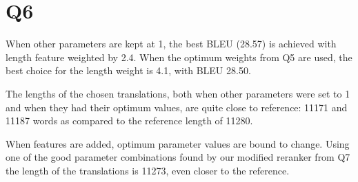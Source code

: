 \section*{Q6}
When other parameters are kept at 1, the best BLEU (28.57) is achieved with length feature weighted by 2.4. When the optimum weights from Q5 are used, the best choice for the length weight is 4.1, with BLEU 28.50.

The lengths of the chosen translations, both when other parameters were set to 1 and when they had their optimum values, are quite close to reference: 11171 and 11187 words as compared to the reference length of 11280.

When features are added, optimum parameter values are bound to change. Using one of the good parameter combinations found by our modified reranker from Q7 the length of the translations is 11273, even closer to the reference.